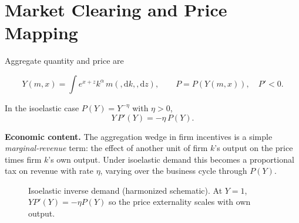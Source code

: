 ﻿\documentclass[11pt,letterpaper,oneside]{article}
\numberwithin{equation}{section}
\newcommand{\1}{\mathbf{1}}
\newcommand{\diff}{,\mathrm{d}}
\begin{document}
\section{Market Clearing and Price Mapping}
Aggregate quantity and price are

$$
Y(m,x)=\int e^{x+z}k^\alpha\,m(\diff k,\diff z),\qquad P=P(Y(m,x)),\quad P'<0.
$$

In the isoelastic case $P(Y)=Y^{-\eta}$ with $\eta>0$,
\begin{equation}\label{eq:isoelastic}
Y\,P'(Y) = -\eta\, P(Y).
\end{equation}

\begin{tcolorbox}[didacticstyle]
\textbf{Economic content.} The aggregation wedge in firm incentives is a simple \emph{marginal-revenue} term: the effect of another unit of firm $k$'s output on the price times firm $k$'s own output. Under isoelastic demand this becomes a proportional tax on revenue with rate $\eta$, varying over the business cycle through $P(Y)$.
\end{tcolorbox}

\begin{figure}[ht]
\centering
\caption{Isoelastic inverse demand (harmonized schematic). At $Y=1$, $Y P'(Y)=-\eta P(Y)$ so the price externality scales with own output.}
\label{fig:isoelastic_demand}
\end{figure}
\end{document}
